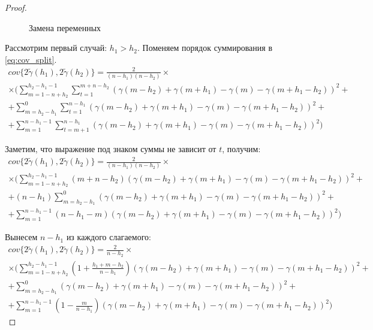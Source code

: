 \begin{proof}
\begin{figure}[H]
	\caption{Замена переменных}
	\label{fig:label}
\end{figure}

Рассмотрим первый случай: $h_1 > h_2$. Поменяем порядок суммирования в \eqref{eq:cov_split}.
\begin{multline*}
	cov\{ 2 \tilde{\gamma}(h_1), 2 \tilde{\gamma}(h_2) \} = \frac{2}{(n - h_1) (n - h_2)} \times \\
	\times (\sum_{m = 1 - n + h_2}^{h_2 - h_1 - 1}\sum_{t = 1}^{m + n - h_2}(\gamma(m - h_2) + \gamma(m + h_1) - \gamma(m) - \gamma(m + h_1 - h_2))^2 + \\
	+ \sum_{m = h_2 - h_1}^{0}\sum_{t = 1}^{n - h_1}(\gamma(m - h_2) + \gamma(m + h_1) - \gamma(m) - \gamma(m + h_1 - h_2))^2 + \\
	+ \sum_{m = 1}^{n - h_1 - 1}\sum_{t = m + 1}^{n - h_1}(\gamma(m - h_2) + \gamma(m + h_1) - \gamma(m) - \gamma(m + h_1 - h_2))^2)
\end{multline*}

Заметим, что выражение под знаком суммы не зависит от $t$, получим:
\begin{multline*}
	cov\{ 2 \tilde{\gamma}(h_1), 2 \tilde{\gamma}(h_2) \} = \frac{2}{(n - h_1) (n - h_2)} \times \\
	\times (\sum_{m = 1 - n + h_2}^{h_2 - h_1 - 1}(m + n - h_2)(\gamma(m - h_2) + \gamma(m + h_1) - \gamma(m) - \gamma(m + h_1 - h_2))^2 + \\
	+ (n - h_1)\sum_{m = h_2 - h_1}^{0}(\gamma(m - h_2) + \gamma(m + h_1) - \gamma(m) - \gamma(m + h_1 - h_2))^2 + \\
	+ \sum_{m = 1}^{n - h_1 - 1}(n - h_1 - m)(\gamma(m - h_2) + \gamma(m + h_1) - \gamma(m) - \gamma(m + h_1 - h_2))^2)
\end{multline*}

Вынесем $ n - h_1 $ из каждого слагаемого:
\begin{multline*}
	cov\{ 2 \tilde{\gamma}(h_1), 2 \tilde{\gamma}(h_2) \} = \frac{2}{n - h_2} \times \\
	\times (\sum_{m = 1 - n + h_2}^{h_2 - h_1 - 1} (1 + \frac{h_1 + m - h_2}{n - h_1})(\gamma(m - h_2) + \gamma(m + h_1) - \gamma(m) - \gamma(m + h_1 - h_2))^2 + \\
	+ \sum_{m = h_2 - h_1}^{0}(\gamma(m - h_2) + \gamma(m + h_1) - \gamma(m) - \gamma(m + h_1 - h_2))^2 + \\
	+ \sum_{m = 1}^{n - h_1 - 1}(1 - \frac{m}{n - h_1})(\gamma(m - h_2) + \gamma(m + h_1) - \gamma(m) - \gamma(m + h_1 - h_2))^2)
\end{multline*}


\end{proof}
